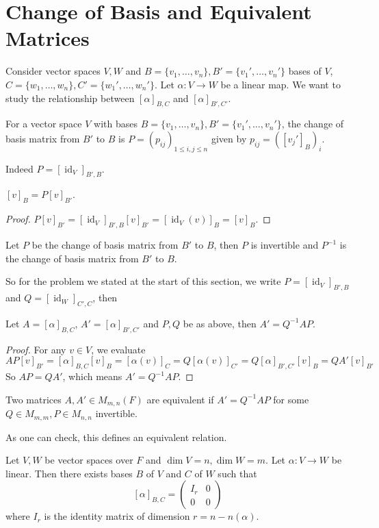 \section{Change of Basis and Equivalent Matrices}
Consider vector spaces $V,W$ and $B=\{v_1,\ldots,v_n\}, B'=\{v_1',\ldots,v_n'\}$ bases of $V$, $C=\{w_1,\ldots,w_n\},C'=\{w_1',\ldots,w_n'\}$.
Let $\alpha:V\to W$ be a linear map.
We want to study the relationship between $[\alpha]_{B,C}$ and $[\alpha]_{B',C'}$.
\begin{definition}
    For a vector space $V$ with bases $B=\{v_1,\ldots,v_n\}, B'=\{v_1',\ldots,v_n'\}$, the change of basis matrix from $B'$ to $B$ is $P=(p_{ij})_{1\le i,j\le n}$ given by $p_{ij}=([v_j']_B)_i$.
\end{definition}
Indeed $P=[\operatorname{id}_V]_{B',B}$.
\begin{lemma}
    $[v]_B=P[v]_{B'}$.
\end{lemma}
\begin{proof}
    $P[v]_{B'}=[\operatorname{id}_V]_{B',B}[v]_{B'}=[\operatorname{id}_V(v)]_B=[v]_B$.
\end{proof}
\begin{remark}
    Let $P$ be the change of basis matrix from $B'$ to $B$, then $P$ is invertible and $P^{-1}$ is the change of basis matrix from $B'$ to $B$.
\end{remark}
So for the problem we stated at the start of this section, we write $P=[\operatorname{id}_V]_{B',B}$ and $Q=[\operatorname{id}_W]_{C',C}$, then
\begin{proposition}
    Let $A=[\alpha]_{B,C}$, $A'=[\alpha]_{B',C'}$ and $P,Q$ be as above, then $A'=Q^{-1}AP$.
\end{proposition}
\begin{proof}
    For any $v\in V$, we evaluate
    $$AP[v]_{B'}=[\alpha]_{B,C}[v]_B=[\alpha(v)]_C=Q[\alpha(v)]_{C'}=Q[\alpha]_{B',C'}[v]_B=QA'[v]_{B'}$$
    So $AP=QA'$, which means $A'=Q^{-1}AP$.
\end{proof}
\begin{definition}
    Two matrices $A,A'\in M_{m,n}(F)$ are equivalent if $A'=Q^{-1}AP$ for some $Q\in M_{m,m},P\in M_{n,n}$ invertible.
\end{definition}
\begin{remark}
    As one can check, this defines an equivalent relation.
\end{remark}
\begin{proposition}\label{eqv_form}
    Let $V,W$ be vector spaces over $F$ and $\dim V=n,\dim W=m$.
    Let $\alpha:V\to W$ be linear.
    Then there exists bases $B$ of $V$ and $C$ of $W$ such that
    $$[\alpha]_{B,C}=\left( \begin{array}{c|c}
        I_r&0\\
        \hline
        0&0
    \end{array} \right)$$
    where $I_r$ is the identity matrix of dimension $r=n-n(\alpha)$.
\end{proposition}
